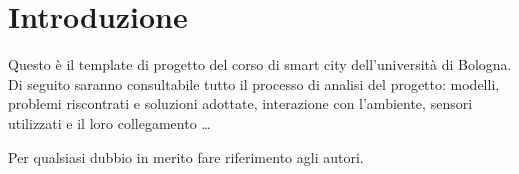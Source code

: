 \section{Introduzione}

Questo è il template di progetto del corso di smart city dell'università di Bologna. Di seguito saranno consultabile tutto il processo di analisi del progetto: modelli, problemi riscontrati e soluzioni adottate, interazione con l'ambiente, sensori utilizzati e il loro collegamento \ldots

Per qualsiasi dubbio in merito fare riferimento agli autori.
